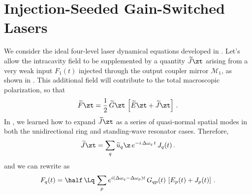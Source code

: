 %
%
%
 \section{Injection-Seeded Gain-Switched Lasers\label{sct:laser_dynamics_1d_mml_qsl}}

We consider the ideal four-level laser dynamical equations developed in . Let's allow the intracavity field to be supplemented by a quantity $\widetilde{J}\zt$ arising from a very weak input $F_1(t)$ injected through the output coupler mirror $\mathcal{M}_1$, as shown in . This additional field will contribute to the total macroscopic polarization, so that
\begin{equation} \label{eqn:qsl_ftzt_inj}
    \widetilde{F}\zt = \frac{1}{2}\, \widetilde{G}\zt\, \left[\widetilde{E}\zt + \widetilde{J}\zt\right]\, .
\end{equation}
In , we learned how to expand $\widetilde{J}\zt$ as a series of quasi-normal spatial modes in both the unidirectional ring and standing-wave resonator cases. Therefore,
\begin{equation}
    \widetilde{J}\zt = \sum_q \widetilde{u}_q\z\, e^{-i\, \Delta \omega_q\, t}\, J_q(t)\, .
\end{equation}
and we can rewrite  as
\begin{equation} \label{eqn:mml_fq_qsl}
  F_q(t) = \half\, \Lq\, \sum_p e^{i \left(\Delta \omega_q - \Delta \omega_p\right) t}\, G_{q p}(t)\, \left[E_p(t) + J_p(t)\right]\, .
\end{equation}

